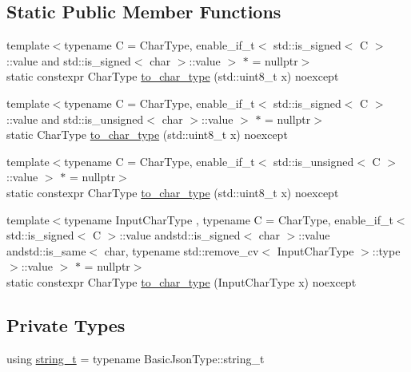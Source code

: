 \subsection*{Static Public Member Functions}
\begin{DoxyCompactItemize}
\item 
{\footnotesize template$<$typename C  = Char\+Type, enable\+\_\+if\+\_\+t$<$ std\+::is\+\_\+signed$<$ C $>$\+::value and std\+::is\+\_\+signed$<$ char $>$\+::value $>$ $\ast$  = nullptr$>$ }\\static constexpr Char\+Type \hyperlink{classnlohmann_1_1detail_1_1binary__writer_ab77aa48692bd4e64e4f051ce6aeb6d2d}{to\+\_\+char\+\_\+type} (std\+::uint8\+\_\+t x) noexcept
\item 
{\footnotesize template$<$typename C  = Char\+Type, enable\+\_\+if\+\_\+t$<$ std\+::is\+\_\+signed$<$ C $>$\+::value and std\+::is\+\_\+unsigned$<$ char $>$\+::value $>$ $\ast$  = nullptr$>$ }\\static Char\+Type \hyperlink{classnlohmann_1_1detail_1_1binary__writer_a5e46f0dd3550901b15cf85265808d1ec}{to\+\_\+char\+\_\+type} (std\+::uint8\+\_\+t x) noexcept
\item 
{\footnotesize template$<$typename C  = Char\+Type, enable\+\_\+if\+\_\+t$<$ std\+::is\+\_\+unsigned$<$ C $>$\+::value $>$ $\ast$  = nullptr$>$ }\\static constexpr Char\+Type \hyperlink{classnlohmann_1_1detail_1_1binary__writer_ab77aa48692bd4e64e4f051ce6aeb6d2d}{to\+\_\+char\+\_\+type} (std\+::uint8\+\_\+t x) noexcept
\item 
{\footnotesize template$<$typename Input\+Char\+Type , typename C  = Char\+Type, enable\+\_\+if\+\_\+t$<$ std\+::is\+\_\+signed$<$ C $>$\+::value andstd\+::is\+\_\+signed$<$ char $>$\+::value andstd\+::is\+\_\+same$<$ char, typename std\+::remove\+\_\+cv$<$ Input\+Char\+Type $>$\+::type $>$\+::value $>$ $\ast$  = nullptr$>$ }\\static constexpr Char\+Type \hyperlink{classnlohmann_1_1detail_1_1binary__writer_a2c2b2132ce56b3b45593374b622baa67}{to\+\_\+char\+\_\+type} (Input\+Char\+Type x) noexcept
\end{DoxyCompactItemize}
\subsection*{Private Types}
\begin{DoxyCompactItemize}
\item 
using \hyperlink{classnlohmann_1_1detail_1_1binary__writer_a29f2ae7a5c4a8c1dae47b3b2310de8a8}{string\+\_\+t} = typename Basic\+Json\+Type\+::string\+\_\+t
\end{DoxyCompactItemize}
